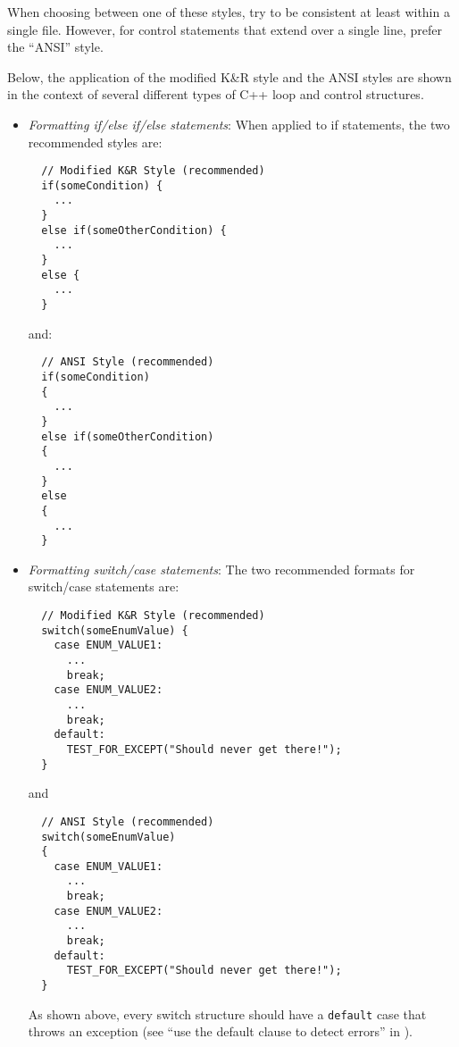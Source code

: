 \begin{itemize}
When choosing between one of these styles, try to be consistent at least
within a single file.  However, for control statements that extend over a
single line, prefer the ``ANSI'' style.

Below, the application of the modified K\&R style and the ANSI styles are
shown in the context of several different types of C++ loop and control
structures.

  \begin{itemize}

  {}\item\textit{Formatting if/else if/else
  statements}: When applied to if statements, the two recommended styles are:

  {\small\begin{verbatim}
  // Modified K&R Style (recommended)
  if(someCondition) {
    ...
  }
  else if(someOtherCondition) {
    ...
  }
  else {
    ...
  }
  \end{verbatim}}
  
  {}\noindent{}and:
  
  {\small\begin{verbatim}
  // ANSI Style (recommended)
  if(someCondition)
  {
    ...
  }
  else if(someOtherCondition)
  {
    ...
  }
  else
  {
    ...
  }
  \end{verbatim}}

  {}\item\textit{Formatting switch/case statements}:
  The two recommended formats for switch/case statements are:

  {\small\begin{verbatim}
  // Modified K&R Style (recommended)
  switch(someEnumValue) {
    case ENUM_VALUE1:
      ...
      break;
    case ENUM_VALUE2:
      ...
      break;
    default:
      TEST_FOR_EXCEPT("Should never get there!");
  }
  \end{verbatim}}

  {}\noindent{}and

  {\small\begin{verbatim}
  // ANSI Style (recommended)
  switch(someEnumValue)
  {
    case ENUM_VALUE1:
      ...
      break;
    case ENUM_VALUE2:
      ...
      break;
    default:
      TEST_FOR_EXCEPT("Should never get there!");
  }
  \end{verbatim}}

  As shown above, every switch structure should have a {}\texttt{default} case
  that throws an exception (see ``use the default clause to detect errors''
  in {}\cite[Section 15.1]{CodeComplete2nd04}).


\end{itemize}
\end{itemize}
